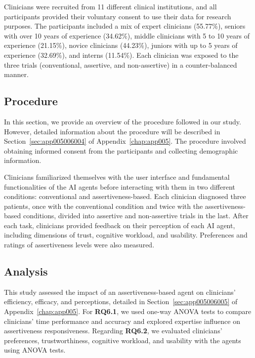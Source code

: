 Clinicians were recruited from 11 different clinical institutions, and all participants provided their voluntary consent to use their data for research purposes.
The participants included a mix of expert clinicians (55.77\%), seniors with over 10 years of experience (34.62\%), middle clinicians with 5 to 10 years of experience (21.15\%), novice clinicians (44.23\%), juniors with up to 5 years of experience (32.69\%), and interns (11.54\%).
Each clinician was exposed to the three trials (conventional, assertive, and non-assertive) in a counter-balanced manner.

\subsection{Procedure}
\label{sec:chap006005004}

In this section, we provide an overview of the procedure followed in our study.
However, detailed information about the procedure will be described in Section~\ref{sec:app005006004} of Appendix~\ref{chap:app005}.
The procedure involved obtaining informed consent from the participants and collecting demographic information.

Clinicians familiarized themselves with the user interface and fundamental functionalities of the \ac{AI} agents before interacting with them in two different conditions: conventional and assertiveness-based.
Each clinician diagnosed three patients, once with the conventional condition and twice with the assertiveness-based conditions, divided into assertive and non-assertive trials in the last.
After each task, clinicians provided feedback on their perception of each \ac{AI} agent, including dimensions of trust, cognitive workload, and usability.
Preferences and ratings of assertiveness levels were also measured.

\subsection{Analysis}
\label{sec:chap006005005}

\textcolor{revised}{This study assessed the impact of an assertiveness-based agent on clinicians' efficiency, efficacy, and perceptions, detailed in Section~\ref{sec:app005006005} of Appendix~\ref{chap:app005}.
For {\bf RQ6.1}, we used one-way \ac{ANOVA} tests to compare clinicians' time performance and accuracy and explored expertise influence on assertiveness responsiveness.
Regarding {\bf RQ6.2}, we evaluated clinicians' preferences, trustworthiness, cognitive workload, and usability with the agents using \ac{ANOVA} tests.}

